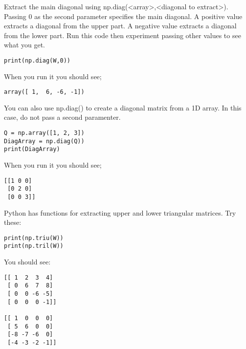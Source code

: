 Extract the main diagonal using np.diag(<array>,<diagonal to extract>). 
Passing 0 as the second parameter specifies the main diagonal. A positive value extracts a diagonal from the upper part. A negative value extracts a diagonal from the lower part. Run this code then experiment passing other values to see what you get.
\begin{Verbatim}
print(np.diag(W,0))
\end{Verbatim}
When you run it you should see;
\begin{Verbatim}
array([ 1,  6, -6, -1])
\end{Verbatim}
You can also use np.diag() to create a diagonal matrix from a 1D array. In this case, do not pass a second paramenter.
\begin{Verbatim}
Q = np.array([1, 2, 3])
DiagArray = np.diag(Q))
print(DiagArray)
\end{Verbatim}
When you run it you should see;
\begin{Verbatim}
[[1 0 0]
 [0 2 0]
 [0 0 3]]
\end{Verbatim}
Python has functions for extracting upper and lower triangular matrices. Try these:
\begin{Verbatim}
print(np.triu(W))
print(np.tril(W))
\end{Verbatim}
You should see:
\begin{Verbatim}
[[ 1  2  3  4]
 [ 0  6  7  8]
 [ 0  0 -6 -5]
 [ 0  0  0 -1]]
 
[[ 1  0  0  0]
 [ 5  6  0  0]
 [-8 -7 -6  0]
 [-4 -3 -2 -1]]
\end{Verbatim}



